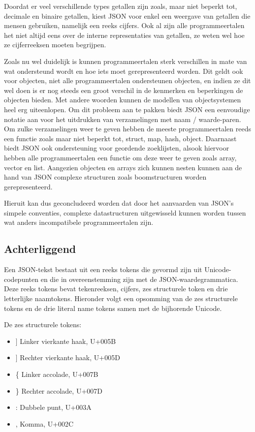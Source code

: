 Doordat er veel verschillende types getallen zijn zoals, maar niet beperkt tot, decimale en binaire getallen, kiest JSON voor enkel een weergave van getallen die mensen gebruiken, namelijk een reeks cijfers. Ook al zijn alle programmeertalen het niet altijd eens over de interne representaties van getallen, ze weten wel hoe ze cijferreeksen moeten begrijpen.

Zoals nu wel duidelijk is kunnen programmeertalen sterk verschillen in mate van wat ondersteund wordt en hoe iets moet gerepresenteerd worden. Dit geldt ook voor objecten, niet alle programmeertalen ondersteunen objecten, en indien ze dit wel doen is er nog steeds een groot verschil in de kenmerken en beperkingen de objecten bieden. Met andere woorden kunnen de modellen van objectsystemen heel erg uiteenlopen. Om dit probleem aan te pakken biedt JSON een eenvoudige notatie aan voor het uitdrukken van verzamelingen met naam / waarde-paren. Om zulke verzamelingen weer te geven hebben de meeste programmeertalen reeds een functie zoals maar niet beperkt tot, struct, map, hash, object.
Daarnaast biedt JSON ook ondersteuning voor geordende zoeklijsten, alsook hiervoor hebben alle programmeertalen een functie om deze weer te geven zoals array, vector en list. Aangezien objecten en arrays zich kunnen nesten kunnen aan de hand van JSON complexe structuren zoals boomstructuren worden gerepresenteerd.

Hieruit kan dus geconcludeerd worden dat door het aanvaarden van JSON's simpele conventies, complexe datastructuren uitgewisseld kunnen worden tussen wat anders incompatibele programmeertalen zijn.



\subsection{Achterliggend}
\label{subsec:Achterliggend}

Een JSON-tekst bestaat uit een reeks tokens die gevormd zijn uit Unicode-codepunten en die in overeenstemming zijn met de JSON-waardegrammatica. Deze reeks tokens bevat tekenreeksen, cijfers, zes structurele token en drie letterlijke naamtokens.
Hieronder volgt een opsomming van de zes structurele tokens en de drie literal name tokens samen met de bijhorende Unicode.

De zes structurele tokens:

\begin{itemize}
    \item $\rbrack$ Linker vierkante haak, U+005B
    \item $\rbrack$ Rechter vierkante haak, U+005D
    \item \{ Linker accolade, U+007B
    \item \} Rechter accolade, U+007D
    \item : Dubbele punt, U+003A
    \item , Komma, U+002C
\end{itemize}

